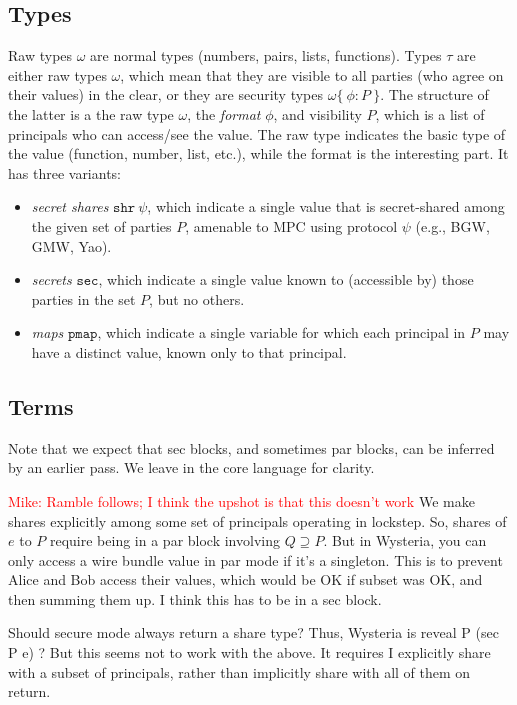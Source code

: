 \documentclass[10pt]{article}
\newcommand{\ssec}{\ensuremath{\mathtt{sec}}}
\newcommand{\isec}{\ensuremath{\mathtt{pmap}}}
\newcommand{\sshare}[1]{\ensuremath{\mathtt{shr}~{#1}}}
\newcommand{\sectyp}[3]{\ensuremath{{#1} \{~{#2}:{#3}~\}}}
\newcommand{\mwh}[1]{\textcolor{red}{Mike: #1}}
\begin{document}
\subsection{Types}

Raw types $\omega$ are normal types (numbers, pairs, lists,
functions). Types $\tau$ are either raw types $\omega$, which mean
that they are visible to all parties (who agree on their values) in
the clear, or they are security types $\sectyp{\omega}{\phi}{P}$. The
structure of the latter is a the raw type $\omega$, the \emph{format}
$\phi$, and visibility $P$, which is a list of principals who can
access/see the value.  The raw type indicates the basic type of the
value (function, number, list, etc.), while the format is the
interesting part. It has three variants:
\begin{itemize}
\item \emph{secret shares} $\sshare\psi$, which indicate a single
  value that is secret-shared among the given set of parties $P$,
  amenable to MPC using protocol $\psi$ (e.g., BGW, GMW, Yao).
\item \emph{secrets} \ssec, which indicate a single value known to
  (accessible by) those parties in the set $P$, but no others.
\item \emph{maps} \isec, which indicate a single variable for which
  each principal in $P$ may have a distinct value, known only to that
  principal. 
\end{itemize}

\subsection{Terms}

Note that we expect that sec blocks, and sometimes par blocks, can be
inferred by an earlier pass. We leave in the core language for clarity.

\mwh{Ramble follows; I think the upshot is that this doesn't work}
We make shares explicitly among some set of principals operating in
lockstep. So, shares of $e$ to $P$ require being in a par block
involving $Q \supseteq P$. But in Wysteria, you can only access a wire
bundle value in par mode if it's a singleton. This is to prevent Alice
and Bob access their values, which would be OK if subset was OK, and
then summing them up. I think this has to be in a sec block.

Should secure mode always return a share type? Thus, Wysteria is
reveal P (sec P e) ? But this seems not to work with the above. It
requires I explicitly share with a subset of principals, rather than
implicitly share with all of them on return.
\end{document}
